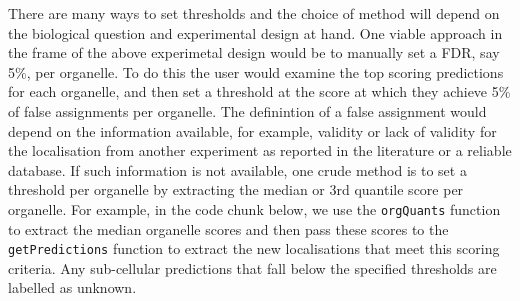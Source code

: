 There are many ways to set thresholds and the choice of method will
depend on the biological question and experimental design at hand. One
viable approach in the frame of the above experimetal design would be
to manually set a FDR, say 5\%, per organelle. To do this the user
would examine the top scoring predictions for each organelle, and then
set a threshold at the score at which they achieve 5\% of false
assignments per organelle.  The definintion of a false assignment
would depend on the information available, for example, validity or
lack of validity for the localisation from another experiment as
reported in the literature or a reliable database.  If such
information is not available, one crude method is to set a threshold
per organelle by extracting the median or 3rd quantile score per
organelle.  For example, in the code chunk below, we use the
\texttt{orgQuants} function to extract the median organelle scores and
then pass these scores to the \texttt{getPredictions} function to
extract the new localisations that meet this scoring criteria. Any
sub-cellular predictions that fall below the specified thresholds are
labelled as unknown.

